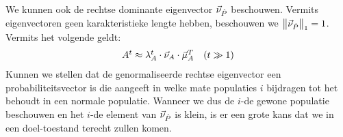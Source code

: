 We kunnen ook de rechtse dominante eigenvector $\evr[\hat{P}]$ beschouwen. Vermits eigenvectoren geen karakteristieke lengte hebben, beschouwen we $\dabs[1]{\evr[\hat{P}]}=1$. Vermits het volgende geldt:
\begin{equation}
\conditional{A^t\approx\ev[A]^t\cdot\evr[A]\cdot\evl[A]^T}{$t\gg1$}
\end{equation}
Kunnen we stellen dat de genormaliseerde rechtse eigenvector een probabiliteitsvector is die aangeeft in welke mate populaties $i$ bijdragen tot het behoudt in een normale populatie. Wanneer we dus de $i$-de gewone populatie beschouwen en het $i$-de element van $\evr[\hat{P}]$ is klein, is er een grote kans dat we in een doel-toestand terecht zullen komen.

\paragraph{}

